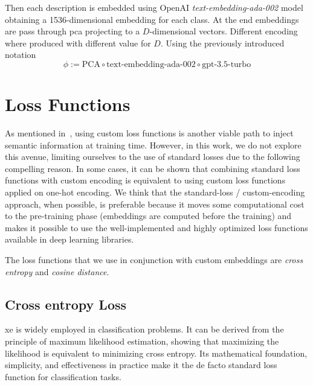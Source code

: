 \vspace{10pt}

Then each description is embedded using OpenAI \emph{text-embedding-ada-002} model obtaining a 1536-dimensional embedding for each class. At the end embeddings are pass through \acrshort{pca} projecting to a $D$-dimensional vectors. Different encoding where produced with different value for $D$.
Using the previously introduced notation
\begin{equation}
  \phi := \textrm{PCA} \circ \textrm{text-embedding-ada-002} \circ
  \textrm{gpt-3.5-turbo}
  \label{eq:desc-pca}
\end{equation}



\section{Loss Functions}
\label{sec:losses}

As mentioned in~, using custom loss functions is another viable path to inject semantic information at training time. However, in this work, we do not explore this avenue, limiting ourselves to the use of standard losses due to the following compelling reason. In some cases, it can be shown that combining standard loss functions with custom encoding is equivalent to using custom loss functions applied on one-hot encoding. We think that the standard-loss / custom-encoding approach, when possible, is preferable because it moves some computational cost to the pre-training phase (embeddings are computed before the training) and makes it possible to use the well-implemented and highly optimized loss functions available in deep learning libraries.

The loss functions that we use in conjunction with custom embeddings are \emph{cross entropy} and \emph{cosine distance}.


\subsection{Cross entropy Loss}
\label{subsec:cross-entropy-loss}

\acrfull{xe} is widely employed in classification problems. It can be derived from the principle of maximum likelihood estimation, showing that maximizing the likelihood is equivalent to minimizing cross entropy. Its mathematical foundation, simplicity, and effectiveness in practice make it the de facto standard loss function for classification tasks.

